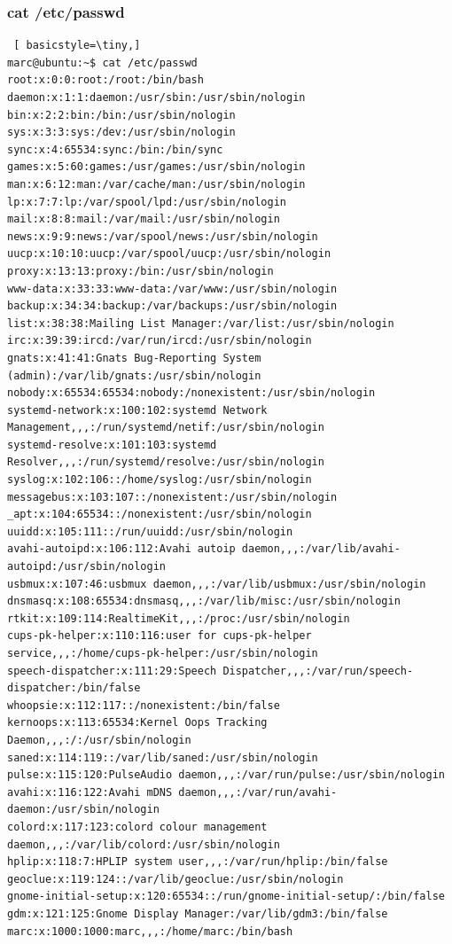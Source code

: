 \documentclass[preprint,11pt]{elsarticle}
\begin{document}
\subsubsection{cat /etc/passwd}
\begin{lstlisting} [ basicstyle=\tiny,]
marc@ubuntu:~$ cat /etc/passwd
root:x:0:0:root:/root:/bin/bash
daemon:x:1:1:daemon:/usr/sbin:/usr/sbin/nologin
bin:x:2:2:bin:/bin:/usr/sbin/nologin
sys:x:3:3:sys:/dev:/usr/sbin/nologin
sync:x:4:65534:sync:/bin:/bin/sync
games:x:5:60:games:/usr/games:/usr/sbin/nologin
man:x:6:12:man:/var/cache/man:/usr/sbin/nologin
lp:x:7:7:lp:/var/spool/lpd:/usr/sbin/nologin
mail:x:8:8:mail:/var/mail:/usr/sbin/nologin
news:x:9:9:news:/var/spool/news:/usr/sbin/nologin
uucp:x:10:10:uucp:/var/spool/uucp:/usr/sbin/nologin
proxy:x:13:13:proxy:/bin:/usr/sbin/nologin
www-data:x:33:33:www-data:/var/www:/usr/sbin/nologin
backup:x:34:34:backup:/var/backups:/usr/sbin/nologin
list:x:38:38:Mailing List Manager:/var/list:/usr/sbin/nologin
irc:x:39:39:ircd:/var/run/ircd:/usr/sbin/nologin
gnats:x:41:41:Gnats Bug-Reporting System (admin):/var/lib/gnats:/usr/sbin/nologin
nobody:x:65534:65534:nobody:/nonexistent:/usr/sbin/nologin
systemd-network:x:100:102:systemd Network Management,,,:/run/systemd/netif:/usr/sbin/nologin
systemd-resolve:x:101:103:systemd Resolver,,,:/run/systemd/resolve:/usr/sbin/nologin
syslog:x:102:106::/home/syslog:/usr/sbin/nologin
messagebus:x:103:107::/nonexistent:/usr/sbin/nologin
_apt:x:104:65534::/nonexistent:/usr/sbin/nologin
uuidd:x:105:111::/run/uuidd:/usr/sbin/nologin
avahi-autoipd:x:106:112:Avahi autoip daemon,,,:/var/lib/avahi-autoipd:/usr/sbin/nologin
usbmux:x:107:46:usbmux daemon,,,:/var/lib/usbmux:/usr/sbin/nologin
dnsmasq:x:108:65534:dnsmasq,,,:/var/lib/misc:/usr/sbin/nologin
rtkit:x:109:114:RealtimeKit,,,:/proc:/usr/sbin/nologin
cups-pk-helper:x:110:116:user for cups-pk-helper service,,,:/home/cups-pk-helper:/usr/sbin/nologin
speech-dispatcher:x:111:29:Speech Dispatcher,,,:/var/run/speech-dispatcher:/bin/false
whoopsie:x:112:117::/nonexistent:/bin/false
kernoops:x:113:65534:Kernel Oops Tracking Daemon,,,:/:/usr/sbin/nologin
saned:x:114:119::/var/lib/saned:/usr/sbin/nologin
pulse:x:115:120:PulseAudio daemon,,,:/var/run/pulse:/usr/sbin/nologin
avahi:x:116:122:Avahi mDNS daemon,,,:/var/run/avahi-daemon:/usr/sbin/nologin
colord:x:117:123:colord colour management daemon,,,:/var/lib/colord:/usr/sbin/nologin
hplip:x:118:7:HPLIP system user,,,:/var/run/hplip:/bin/false
geoclue:x:119:124::/var/lib/geoclue:/usr/sbin/nologin
gnome-initial-setup:x:120:65534::/run/gnome-initial-setup/:/bin/false
gdm:x:121:125:Gnome Display Manager:/var/lib/gdm3:/bin/false
marc:x:1000:1000:marc,,,:/home/marc:/bin/bash

        \end{lstlisting}
        
\end{document}

